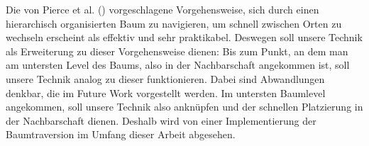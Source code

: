 Die von Pierce et al. (\cite{pierce_representations}) vorgeschlagene Vorgehensweise, sich durch einen hierarchisch organisierten Baum zu navigieren, um schnell zwischen Orten zu wechseln erscheint als effektiv und sehr praktikabel. Deswegen soll unsere Technik als Erweiterung zu dieser Vorgehensweise dienen: Bis zum Punkt, an dem man am untersten Level des Baums, also in der Nachbarschaft angekommen ist, soll unsere Technik analog zu dieser funktionieren. Dabei sind Abwandlungen denkbar, die im Future Work vorgestellt werden. Im untersten Baumlevel angekommen, soll unsere Technik also anknüpfen und der schnellen Platzierung in der Nachbarschaft dienen. Deshalb wird von einer Implementierung der Baumtraversion im Umfang dieser Arbeit abgesehen.